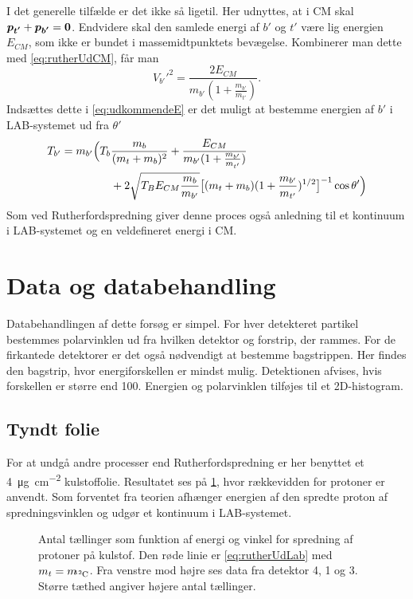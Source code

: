 I det generelle tilfælde er det ikke så ligetil. Her udnyttes, at i CM skal
$\bm{p_{t'}} + \bm{p_{b'}} = \bm{0}$. Endvidere skal den samlede energi af $b'$ og $t'$ være
lig energien $E_{CM}$, som ikke er bundet i massemidtpunktets bevægelse. Kombinerer man dette med
\cref{eq:rutherUdCM}, får man
\begin{equation}
  V_{b'}'^{2} = \frac{2E_{CM}}{m_{b'}(1+\frac{m_{b'}}{m_{t'}})}.
\end{equation}
Indsættes dette i \cref{eq:udkommendeE} er det muligt at bestemme energien af $b'$ i LAB-systemet ud
fra $\theta'$
\begin{align}
  T_{b'} = m_{b'} \Bigl(T_{b}&\frac{m_{b}}{(m_{t} + m_{b})^{2}} + \frac{E_{CM}}{m_{b'}(1+\frac{m_{b'}}{m_{t'}})} \notag\\
  &+ 2 \sqrt{T_{B}E_{CM} \frac{m_{b}}{m_{b'}}}\bigl[(m_{t} + m_{b})(1 + \frac{m_{b'}}{m_{t'}})^{1/2}\bigr]^{-1} \cos \theta'\Bigr)
  \label{eq:alphaUdLab}
\end{align}
Som ved Rutherfordspredning giver denne proces også anledning til et kontinuum i LAB-systemet og
en veldefineret energi i CM. 


\section{Data og databehandling}
\label{sec:ruther-data}

Databehandlingen af dette forsøg er simpel. For hver detekteret partikel bestemmes polarvinklen ud
fra hvilken detektor og forstrip, der rammes. For de firkantede detektorer er det også nødvendigt at
bestemme bagstrippen. Her findes den bagstrip, hvor energiforskellen er mindst mulig. Detektionen
afvises, hvis forskellen er større end 100\keV. Energien og polarvinklen tilføjes til et
2D-histogram.

\subsection{Tyndt folie}
\label{sec:tyndtfolie}

For at undgå andre processer end Rutherfordspredning er her benyttet et \SI[per-mode =
symbol]{4}{\micro\gram\per\cm\squared} kulstoffolie. Resultatet ses på \cref{fig:1072}, hvor
rækkevidden for protoner er anvendt. Som forventet fra teorien afhænger energien af den spredte
proton af spredningsvinklen og udgør et kontinuum i LAB-systemet.
\begin{figure}[htb]
  \centering
  \hfill
  \caption{Antal tællinger som funktion af energi og vinkel for spredning af protoner på
    kulstof. Den røde linie er \cref{eq:rutherUdLab} med $m_{t} = m_{\!\!\Carb}$. Fra venstre mod
    højre ses data fra detektor 4, 1 og 3. Større tæthed angiver højere antal tællinger.}
  \label{fig:1072}
\end{figure}

